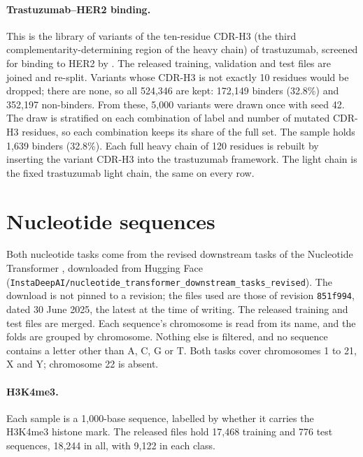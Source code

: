 \paragraph{Trastuzumab--HER2 binding.} This is the library of variants of the ten-residue CDR-H3 (the third complementarity-determining region of the heavy chain) of trastuzumab, screened for binding to HER2 by \citet{Chinery2024}. The released training, validation and test files are joined and re-split. Variants whose CDR-H3 is not exactly 10 residues would be dropped; there are none, so all 524,346 are kept: 172,149 binders (32.8\%) and 352,197 non-binders. From these, 5,000 variants were drawn once with seed 42. The draw is stratified on each combination of label and number of mutated CDR-H3 residues, so each combination keeps its share of the full set. The sample holds 1,639 binders (32.8\%). Each full heavy chain of 120 residues is rebuilt by inserting the variant CDR-H3 into the trastuzumab framework. The light chain is the fixed trastuzumab light chain, the same on every row.

\section{Nucleotide sequences}\label{app:datasets:nucleotides}

Both nucleotide tasks come from the revised downstream tasks of the Nucleotide Transformer \citep{DallaTorre2025}, downloaded from Hugging Face (\texttt{InstaDeepAI/nucleotide\_transformer\_downstream\_tasks\_revised}). The download is not pinned to a revision; the files used are those of revision \texttt{851f994}, dated 30 June 2025, the latest at the time of writing. The released training and test files are merged. Each sequence's chromosome is read from its name, and the folds are grouped by chromosome. Nothing else is filtered, and no sequence contains a letter other than A, C, G or T. Both tasks cover chromosomes 1 to 21, X and Y; chromosome 22 is absent.

\paragraph{H3K4me3.} Each sample is a 1,000-base sequence, labelled by whether it carries the H3K4me3 histone mark. The released files hold 17,468 training and 776 test sequences, 18,244 in all, with 9,122 in each class.

